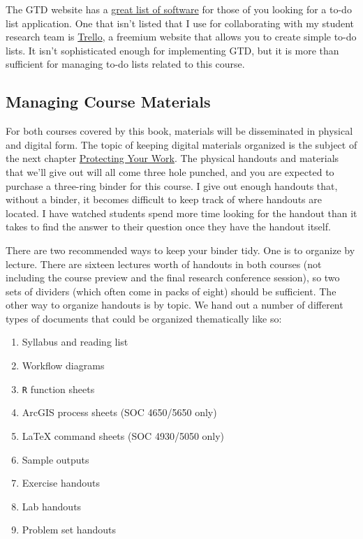 \documentclass[]{book}
\providecommand{\tightlist}{%
  \setlength{\itemsep}{0pt}\setlength{\parskip}{0pt}}
\theoremstyle{definition}
\theoremstyle{definition}
\theoremstyle{definition}
\theoremstyle{remark}
\begin{document}
The GTD website has a
\href{http://gettingthingsdone.com/common-tools-software/}{great list of
software} for those of you looking for a to-do list application. One
that isn't listed that I use for collaborating with my student research
team is \href{https://trello.com}{Trello}, a freemium website that
allows you to create simple to-do lists. It isn't sophisticated enough
for implementing GTD, but it is more than sufficient for managing to-do
lists related to this course.

\subsection{Managing Course Materials}\label{managing-course-materials}

For both courses covered by this book, materials will be disseminated in
physical and digital form. The topic of keeping digital materials
organized is the subject of the next chapter
\protect\hyperlink{protecting-your-work}{Protecting Your Work}. The
physical handouts and materials that we'll give out will all come three
hole punched, and you are expected to purchase a three-ring binder for
this course. I give out enough handouts that, without a binder, it
becomes difficult to keep track of where handouts are located. I have
watched students spend more time looking for the handout than it takes
to find the answer to their question once they have the handout itself.

There are two recommended ways to keep your binder tidy. One is to
organize by lecture. There are sixteen lectures worth of handouts in
both courses (not including the course preview and the final research
conference session), so two sets of dividers (which often come in packs
of eight) should be sufficient. The other way to organize handouts is by
topic. We hand out a number of different types of documents that could
be organized thematically like so:

\begin{enumerate}
\def\labelenumi{\arabic{enumi}.}
\tightlist
\item
  Syllabus and reading list
\item
  Workflow diagrams
\item
  \texttt{R} function sheets
\item
  ArcGIS process sheets (SOC 4650/5650 only)
\item
  LaTeX command sheets (SOC 4930/5050 only)
\item
  Sample outputs
\item
  Exercise handouts
\item
  Lab handouts
\item
  Problem set handouts
\end{enumerate}
\end{document}
